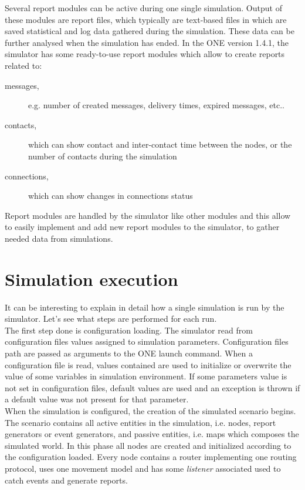 Several report modules can be active during one single simulation. Output of these modules are report files, which typically are text-based files in which are saved statistical and log data gathered during the simulation. These data can be further analysed when the simulation has ended. In the ONE version 1.4.1, the simulator has some ready-to-use report modules which allow to create reports related to:

\begin{description}
\item[messages,] e.g. number of created messages, delivery times, expired messages, etc..
\item[contacts,] which can show contact and inter-contact time between the nodes, or the number of contacts during the simulation
\item[connections,] which can show changes in connections status
\end{description}

Report modules are handled by the simulator like other modules and this allow to easily implement and add new report modules to the simulator, to gather needed data from simulations.


\section{Simulation execution}
\label{esecuzioneONE}
It can be interesting to explain in detail how a single simulation is run by the simulator. Let's see what steps are performed for each run.
\\

The first step done is configuration loading. The simulator read from configuration files values assigned to simulation parameters. Configuration files path are passed as arguments to the ONE launch command. When a configuration file is read, values contained are used to initialize or overwrite the value of some variables in simulation environment. If some parameters value is not set in configuration files, default values are used and an exception is thrown if a default value was not present for that parameter.
\\

When the simulation is configured, the creation of the simulated scenario begins. The scenario contains all active entities in the simulation, i.e. nodes, report generators or event generators, and passive entities, i.e. maps which composes the simulated world. In this phase all nodes are created and initialized according to the configuration loaded. Every node contains a router implementing one routing protocol, uses one movement model and has some \textit{listener} associated used to catch events and generate reports.
\\

